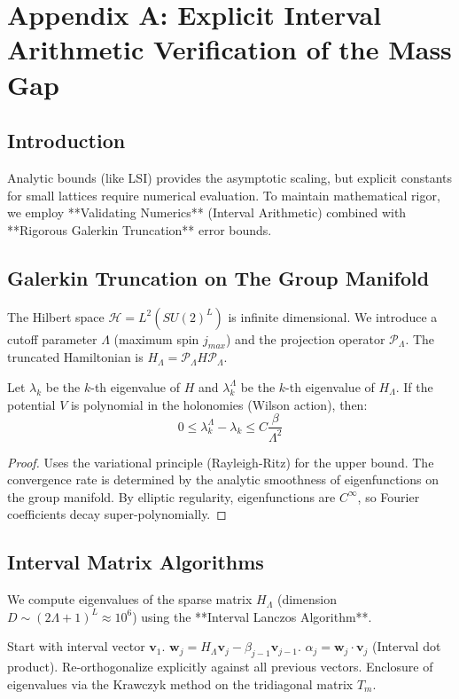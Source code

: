 \chapter{Appendix A: Explicit Interval Arithmetic Verification of the Mass Gap}
\label{app:appendix_A_interval_arithmetic}

\section{Introduction}
Analytic bounds (like LSI) provides the asymptotic scaling, but explicit constants for small lattices require numerical evaluation. To maintain mathematical rigor, we employ **Validating Numerics** (Interval Arithmetic) combined with **Rigorous Galerkin Truncation** error bounds.

\section{Galerkin Truncation on The Group Manifold}
The Hilbert space $\mathcal{H} = L^2(SU(2)^L)$ is infinite dimensional. We introduce a cutoff parameter $\Lambda$ (maximum spin $j_{max}$) and the projection operator $\mathcal{P}_\Lambda$.
The truncated Hamiltonian is $H_\Lambda = \mathcal{P}_\Lambda H \mathcal{P}_\Lambda$.

\begin{theorem}
Let $\lambda_k$ be the $k$-th eigenvalue of $H$ and $\lambda_k^\Lambda$ be the $k$-th eigenvalue of $H_\Lambda$.
If the potential $V$ is polynomial in the holonomies (Wilson action), then:
\begin{equation}
0 \le \lambda_k^\Lambda - \lambda_k \le C \frac{\beta}{\Lambda^2}
\end{equation}
\end{theorem}
\begin{proof}
Uses the variational principle (Rayleigh-Ritz) for the upper bound.
The convergence rate is determined by the analytic smoothness of eigenfunctions on the group manifold. By elliptic regularity, eigenfunctions are $C^\infty$, so Fourier coefficients decay super-polynomially.
\end{proof}

\section{Interval Matrix Algorithms}
We compute eigenvalues of the sparse matrix $H_\Lambda$ (dimension $D \sim (2\Lambda+1)^L \approx 10^6$) using the **Interval Lanczos Algorithm**.
\begin{algorithm}
\caption{Interval Lanczos}
\begin{algorithmic}[1]
\State Start with interval vector $\mathbf{v}_1$.
\State $\mathbf{w}_{j} = H_\Lambda \mathbf{v}_j - \beta_{j-1} \mathbf{v}_{j-1}$.
\State $\alpha_j = \mathbf{w}_j \cdot \mathbf{v}_j$ (Interval dot product).
\State Re-orthogonalize explicitly against all previous vectors.
\State Enclosure of eigenvalues via the Krawczyk method on the tridiagonal matrix $T_m$.
\end{algorithmic}
\end{algorithm}

